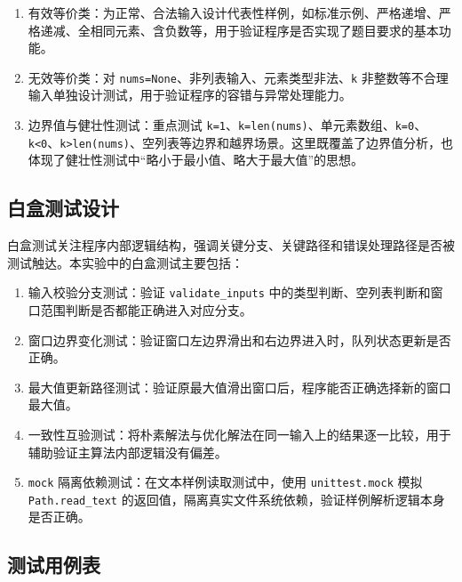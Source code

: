 \documentclass[a4paper,UTF8,fontset=none]{ctexart}
\begin{document}
\begin{enumerate}
    \item 有效等价类：为正常、合法输入设计代表性样例，如标准示例、严格递增、严格递减、全相同元素、含负数等，用于验证程序是否实现了题目要求的基本功能。
    \item 无效等价类：对 \texttt{nums=None}、非列表输入、元素类型非法、\texttt{k} 非整数等不合理输入单独设计测试，用于验证程序的容错与异常处理能力。
    \item 边界值与健壮性测试：重点测试 \texttt{k=1}、\texttt{k=len(nums)}、单元素数组、\texttt{k=0}、\texttt{k<0}、\texttt{k>len(nums)}、空列表等边界和越界场景。这里既覆盖了边界值分析，也体现了健壮性测试中“略小于最小值、略大于最大值”的思想。
\end{enumerate}

\subsection{白盒测试设计}

白盒测试关注程序内部逻辑结构，强调关键分支、关键路径和错误处理路径是否被测试触达。本实验中的白盒测试主要包括：

\begin{enumerate}
    \item 输入校验分支测试：验证 \texttt{validate\_inputs} 中的类型判断、空列表判断和窗口范围判断是否都能正确进入对应分支。
    \item 窗口边界变化测试：验证窗口左边界滑出和右边界进入时，队列状态更新是否正确。
    \item 最大值更新路径测试：验证原最大值滑出窗口后，程序能否正确选择新的窗口最大值。
    \item 一致性互验测试：将朴素解法与优化解法在同一输入上的结果逐一比较，用于辅助验证主算法内部逻辑没有偏差。
    \item \texttt{mock} 隔离依赖测试：在文本样例读取测试中，使用 \texttt{unittest.mock} 模拟 \texttt{Path.read\_text} 的返回值，隔离真实文件系统依赖，验证样例解析逻辑本身是否正确。
\end{enumerate}

\subsection{测试用例表}
\end{document}
